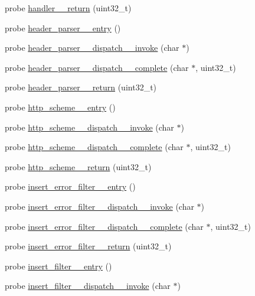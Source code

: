 \begin{DoxyCompactItemize}
probe \hyperlink{apache__probes_8d_a6dcb4f70cf1cd010b4ebbee1572583c0}{handler\+\_\+\+\_\+return} (uint32\+\_\+t)
\item 
probe \hyperlink{apache__probes_8d_a653f273ae90502e5de21415c9852d280}{header\+\_\+parser\+\_\+\+\_\+entry} ()
\item 
probe \hyperlink{apache__probes_8d_a4ce6b76f1f9d062d9d1eedef8ea54b54}{header\+\_\+parser\+\_\+\+\_\+dispatch\+\_\+\+\_\+invoke} (char $\ast$)
\item 
probe \hyperlink{apache__probes_8d_a3e7b0603858c8c9d9643ef5cf42d46c1}{header\+\_\+parser\+\_\+\+\_\+dispatch\+\_\+\+\_\+complete} (char $\ast$, uint32\+\_\+t)
\item 
probe \hyperlink{apache__probes_8d_aad35171a4ff1a82d313637f03e60992d}{header\+\_\+parser\+\_\+\+\_\+return} (uint32\+\_\+t)
\item 
probe \hyperlink{apache__probes_8d_a0f5e8df7861a01db843c6009ceae2abf}{http\+\_\+scheme\+\_\+\+\_\+entry} ()
\item 
probe \hyperlink{apache__probes_8d_a79a75fe079bbe7467aac0984169a1ec7}{http\+\_\+scheme\+\_\+\+\_\+dispatch\+\_\+\+\_\+invoke} (char $\ast$)
\item 
probe \hyperlink{apache__probes_8d_a4dc8b6cbba121503ddd54cbc90e0aa76}{http\+\_\+scheme\+\_\+\+\_\+dispatch\+\_\+\+\_\+complete} (char $\ast$, uint32\+\_\+t)
\item 
probe \hyperlink{apache__probes_8d_af6579c19cf85c9939e41608db24acde1}{http\+\_\+scheme\+\_\+\+\_\+return} (uint32\+\_\+t)
\item 
probe \hyperlink{apache__probes_8d_a89dc97ea7809a7d12e6b6d1c5d9b0821}{insert\+\_\+error\+\_\+filter\+\_\+\+\_\+entry} ()
\item 
probe \hyperlink{apache__probes_8d_a197b02647893a0215689325193b76f5a}{insert\+\_\+error\+\_\+filter\+\_\+\+\_\+dispatch\+\_\+\+\_\+invoke} (char $\ast$)
\item 
probe \hyperlink{apache__probes_8d_a44834574c4e60d5b47478dcfd0d213dc}{insert\+\_\+error\+\_\+filter\+\_\+\+\_\+dispatch\+\_\+\+\_\+complete} (char $\ast$, uint32\+\_\+t)
\item 
probe \hyperlink{apache__probes_8d_aeabe643fbe5835237b4c458035812dcb}{insert\+\_\+error\+\_\+filter\+\_\+\+\_\+return} (uint32\+\_\+t)
\item 
probe \hyperlink{apache__probes_8d_a1b3b08204ce51f52be769b3b1fc35d8d}{insert\+\_\+filter\+\_\+\+\_\+entry} ()
\item 
probe \hyperlink{apache__probes_8d_ac98c05d787151e6995bf7a87d785180d}{insert\+\_\+filter\+\_\+\+\_\+dispatch\+\_\+\+\_\+invoke} (char $\ast$)

\end{DoxyCompactItemize}
